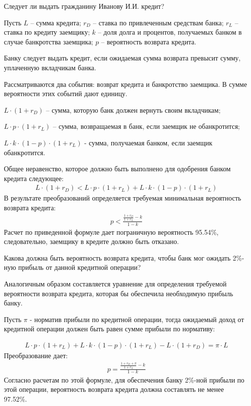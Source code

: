 \documentclass[12pt, table, a4paper,twoside]{exam}
\begin{document}
\begin{questions}
\begin{subparts}
\subpart[10] Следует ли выдать гражданину Иванову И.И. кредит?

\begin{solution}[12em]
Пусть $L$ – сумма кредита; $r_D$ – ставка по привлеченным средствам банка;  $r_L$ – ставка по кредиту заемщику; $k$ – доля долга и процентов, получаемых банком в случае банкротства заемщика; $p$ – вероятность возврата кредита.

Банку следует выдать кредит, если ожидаемая сумма возврата превысит сумму, уплаченную вкладчикам банка.

Рассматриваются два события: возврат кредита и банкротство заемщика. В сумме вероятности этих событий дают единицу. 

$L\cdot (1+r_D )$ – сумма, которую банк должен вернуть своим вкладчикам;

$L \cdot p \cdot (1+r_L )$ – сумма, возвращаемая в банк, если заемщик не обанкротится;

$L \cdot k \cdot (1-p) \cdot (1+r_L )$ - сумма, получаемая банком, если заемщик обанкротится.

Общее неравенство, которое должно быть выполнено для одобрения банком кредита следующее:
\begin{align}
L\cdot (1+r_D )<L \cdot p \cdot (1+r_L ) + L \cdot k \cdot (1-p) \cdot (1+r_L )
\end{align}
В результате преобразований определяется требуемая минимальная вероятность возврата кредита:
\begin{align}
p<\frac{\frac{1+r_D}{1+r_L}-k}{1-k}
\end{align}	
Расчет по приведенной формуле дает пограничную вероятность 95.54\%, следовательно, заемщику в кредите должно быть отказано.
\end{solution}

\subpart[10] Какова должна быть вероятность возврата кредита, чтобы банк мог ожидать 2\%-ную прибыль от данной кредитной операции?

\begin{solution}[12em]
Аналогичным образом составляется уравнение для определения требуемой вероятности возврата кредита, которая бы обеспечила необходимую прибыль банку.

Пусть $\pi$ - норматив прибыли по кредитной операции, тогда ожидаемый доход от кредитной операции должен быть равен сумме прибыли по нормативу:

\begin{align}
L \cdot p \cdot (1+r_L ) + L \cdot k \cdot (1-p) \cdot (1+r_L ) - L \cdot (1+r_D ) = \pi \cdot L
\end{align}
Преобразование дает:
\begin{align}
p = \frac{\frac{1+r_D+\pi}{1+r_L} - k}{1 - k}
\end{align}
Согласно расчетам по этой формуле, для обеспечения банку 2\%-ной прибыли по этой операции, вероятность возврата кредита должна составлять не менее 97.52\%.
\end{solution}


\end{subparts}
\end{questions}
\end{document}
